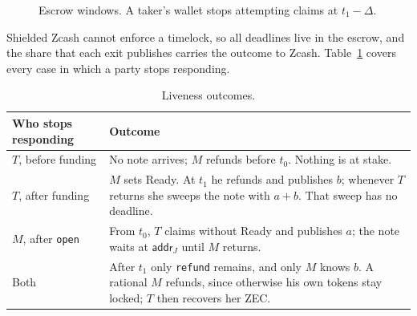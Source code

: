\documentclass[10pt,letterpaper]{article}
\newcommand{\fn}[1]{\texttt{#1}}
\begin{document}
\begin{figure}[H]
\centering
{}
\caption{Escrow windows. A taker's wallet stops attempting claims at $t_1 - \Delta$.}
\end{figure}

Shielded Zcash cannot enforce a timelock, so all deadlines live in the escrow, and the share that
each exit publishes carries the outcome to Zcash. Table~\ref{tab:liveness} covers every case in
which a party stops responding.

\begin{table}[H]
\centering\small
\begin{tabularx}{\linewidth}{@{}p{3.6cm}X@{}}
\toprule
\textbf{Who stops responding} & \textbf{Outcome}\\
\midrule
$T$, before funding & No note arrives; $M$ refunds before $t_0$. Nothing is at stake.\\
$T$, after funding & $M$ sets Ready. At $t_1$ he refunds and publishes $b$; whenever $T$ returns she sweeps the note with $a+b$. That sweep has no deadline.\\
$M$, after \fn{open} & From $t_0$, $T$ claims without Ready and publishes $a$; the note waits at $\mathsf{addr}_J$ until $M$ returns.\\
Both & After $t_1$ only \fn{refund} remains, and only $M$ knows $b$. A rational $M$ refunds, since otherwise his own tokens stay locked; $T$ then recovers her ZEC.\\
\bottomrule
\end{tabularx}
\caption{Liveness outcomes.}
\label{tab:liveness}
\end{table}
\end{document}

